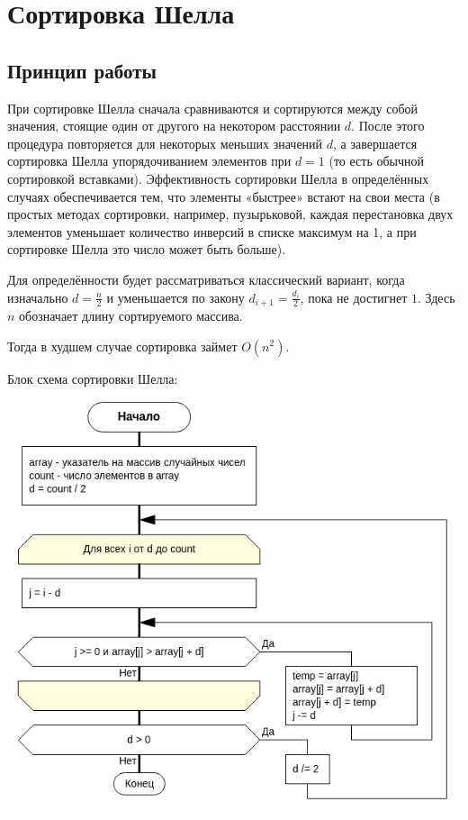 \section{Сортировка Шелла}

\subsection{Принцип работы}

При сортировке Шелла сначала сравниваются и сортируются между собой значения, стоящие один от другого на некотором расстоянии $d$.
После этого процедура повторяется для некоторых меньших значений $d$, а завершается сортировка Шелла упорядочиванием элементов при $d = 1$ (то есть обычной сортировкой вставками).
Эффективность сортировки Шелла в определённых случаях обеспечивается тем, что элементы «быстрее» встают на свои места (в простых методах сортировки, например, пузырьковой, каждая перестановка двух элементов уменьшает количество инверсий в списке максимум на 1, а при сортировке Шелла это число может быть больше).

Для определённости будет рассматриваться классический вариант, когда изначально $d = \frac{n}{2}$ и уменьшается по закону $d_{i+1} = \frac{d_{i}}{2}$, пока не достигнет $1$. 
Здесь $n$ обозначает длину сортируемого массива.

Тогда в худшем случае сортировка займет $O(n^2)$.

Блок схема сортировки Шелла:\\
\includegraphics[scale=0.6]{res/original.png}

